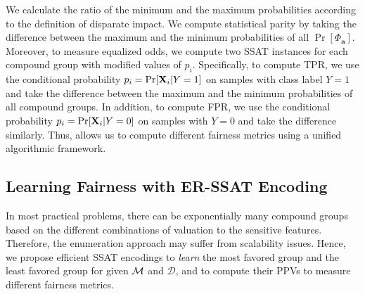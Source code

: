 We calculate the ratio of the minimum and the maximum probabilities according to the definition of disparate impact. 
We compute statistical parity by taking the difference between the maximum and the minimum probabilities of all $ \Pr[\Phi_{\mathbf{a}}] $.
Moreover, to measure equalized odds, we compute two SSAT instances for each compound group with modified values of $ p_i $. 
Specifically, to compute TPR, we use the conditional probability $ p_i = \Pr[\mathbf{X}_i|Y=1] $ on samples with class label $ Y = 1 $ and take the difference between the maximum and the minimum probabilities of all compound groups. In addition, to compute FPR, we use the conditional probability $ p_i = \Pr[\mathbf{X}_i|Y=0] $ on samples with $ Y = 0 $ and take the difference similarly.
Thus, {\justiciaenum} allows us to compute different fairness metrics using a unified algorithmic framework.


\subsection{Learning Fairness with ER-SSAT Encoding}
\label{fairness_justicia_sec:learn_ssat}
In most practical problems, there can be exponentially many compound groups based on the different combinations of valuation to the sensitive features. 
Therefore, the enumeration approach may suffer from scalability issues. 
Hence, we propose efficient SSAT encodings to \textit{learn} the most favored group and the least favored group for given  $\mathcal{M}$ and $ \mathcal{D} $, and to compute their PPVs to measure different fairness metrics. 

